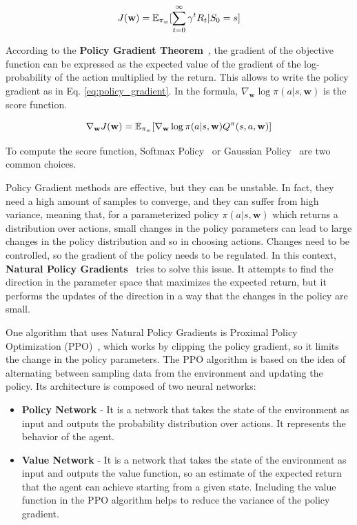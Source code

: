 \begin{equation} \label{eq:obj_function}
    J(\textbf{w}) = \operatorname{\mathbb{E}}_{\pi_w}[\sum_{t=0}^{\infty} \gamma^t R_t | S_0 = s]
\end{equation}

According to the \textbf{Policy Gradient Theorem}~\citep{sutton1999policy}, the gradient of the objective function can be expressed as the expected value of the gradient of the log-probability of the action multiplied by the return.
This allows to write the policy gradient as in Eq. \ref{eq:policy_gradient}.
In the formula, $\nabla_{\textbf{w}} \log \pi(a|s, \textbf{w})$ is the score function.

\begin{equation} \label{eq:policy_gradient}
    \nabla_{\textbf{w}} J(\textbf{w}) = \operatorname{\mathbb{E}}_{\pi_w}[\nabla_{\textbf{w}} \log \pi(a|s, \textbf{w}) Q^{\pi}(s, a, \textbf{w})]
\end{equation}


To compute the score function, Softmax Policy~\citep{williams1992simple} or Gaussian Policy~\citep{lillicrap2015continuous} are two common choices.

Policy Gradient methods are effective, but they can be unstable.
In fact, they need a high amount of samples to converge, and they can suffer from high variance, meaning that, for a parameterized policy $\pi(a|s, \textbf{w})$ which returns a distribution over actions, small changes in the policy parameters can lead to large changes in the policy distribution and so in choosing actions.
Changes need to be controlled, so the gradient of the policy needs to be regulated.
In this context, \textbf{Natural Policy Gradients}~\citep{kakade2001natural} tries to solve this issue.
It attempts to find the direction in the parameter space that maximizes the expected return, but it performs the updates of the direction in a way that the changes in the policy are small.


One algorithm that uses Natural Policy Gradients is Proximal Policy Optimization (PPO)~\citep{schulman2017proximal}, which works by clipping the policy gradient, so it limits the change in the policy parameters.
The PPO algorithm is based on the idea of alternating between sampling data from the environment and updating the policy.
Its architecture is composed of two neural networks:

\begin{itemize}
    \item \textbf{Policy Network} - It is a network that takes the state of the environment as input and outputs the probability distribution over actions.
    It represents the behavior of the agent.
    \item \textbf{Value Network} - It is a network that takes the state of the environment as input and outputs the value function, so an estimate of the expected return that the agent can achieve starting from a given state.
    Including the value function in the PPO algorithm helps to reduce the variance of the policy gradient.
\end{itemize}

